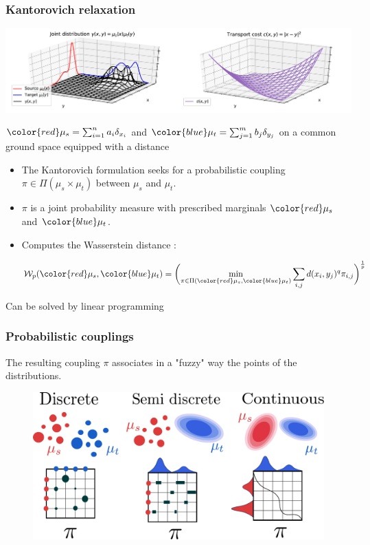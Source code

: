 \documentclass[french,9pt]{beamer}
\newcommand{\red}[1]{{\color{red} #1}}
\newcommand{\blue}[1]{{\color{blue} #1}}
\begin{document}
\begin{frame}
  \frametitle{Kantorovich relaxation}

  \begin{center}
      \includegraphics[width=0.9\linewidth]{fig/dist_kanto}
  \end{center}
$\red{\mu_{s}}=\sum_{i=1}^{n} a_{i} \delta_{x_{i}}$ and $\blue{\mu_{t}}=\sum_{j=1}^{m} b_{j} \delta_{y_{j}}$ on a common ground space equipped with a distance

  \begin{itemize}

\item The Kantorovich formulation seeks for a probabilistic coupling $\pi \in \Pi(\mu_{s} \times \mu_{t})$ between
$\mu_{s}$ and $\mu_{t}$.
\item $\pi$ is a joint probability measure with prescribed
  marginals $\red{\mu_s}$ and $\blue{\mu_t}$.
\item Computes the Wasserstein distance :

\begin{equation}
\mathcal{W}_{p}(\red{\mu_{s}},\blue{\mu_{t}})=\bigg(\underset{\pi \in \Pi(\red{\mu_{s}},\blue{\mu_{t}})}{\min} \sum_{i,j} d(x_{i},y_{j})^{q} \pi_{i,j} \bigg)^{\frac{1}{p}}
\label{otwdiscrete}
\end{equation}

  \end{itemize}
Can be solved by linear programming
\end{frame}

\begin{frame}
  \frametitle{Probabilistic couplings}
  
  The resulting coupling $\pi$ associates in a "fuzzy" way the points of the distributions.
  
  \begin{figure}
  \begin{center}
      \includegraphics[width=0.9\linewidth]{fig/3ways.pdf}
  \end{center}
  \end{figure}
\end{frame}
\end{document}
